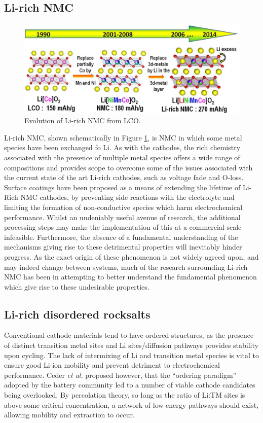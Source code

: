 \newpage
\subsection{Li-rich NMC}
\begin{figure}
\centering
\includegraphics[width=\linewidth]{figures/structures/tarasconNMC}
\caption[Evolution of Li-rich NMC from LCO.]{Evolution of Li-rich NMC from LCO.\cite{Rozier2015}} 
\label{fig:tarasconNMC}
\end{figure}

Li-rich NMC, shown schematically in Figure \ref{fig:tarasconNMC}, is NMC in which some metal species have been exchanged fo Li.
As with the  cathodes, the rich chemistry associated with the presence of multiple metal species offers a wide range of compositions and provides scope to overcome some of the issues associated with the current state of the art Li-rich cathodes, such as voltage fade and O-loss.
Surface coatings have been proposed as a means of extending the lifetime of Li-Rich NMC cathodes, by preventing side reactions with the electrolyte and limiting the formation of non-conductive species which harm electrochemical performance.
Whilst an undeniably useful avenue of research, the additional processing steps may make the implementation of this at a commercial scale infeasible.
Furthermore, the absence of a fundamental understanding of the mechanisms giving rise to these detrimental properties will inevitably hinder progress.
As the exact origin of these phenomenon is not widely agreed upon, and may indeed change between systems, much of the research surrounding Li-rich NMC has been in attempting to better understand the fundamental phenomenon which give rise to these undesirable properties.


\newpage
\subsection{Li-rich disordered rocksalts}
Conventional cathode materials tend to have ordered structures, as the presence of distinct transition metal sites and Li sites/diffusion pathways provides stability upon cycling.
The lack of intermixing of Li and transition metal species is vital to ensure good Li-ion mobility and prevent detriment to electrochemical performance.
Ceder \textit{et al.}\cite{Casimir2014} proposed however, that the ``ordering paradigm'' adopted by the battery community led to a number of viable cathode candidates being overlooked.
By percolation theory, so long as the ratio of Li:TM sites is above some critical concentration, a network of low-energy pathways should exist, allowing mobility and extraction to occur.\cite{Urban2014}

